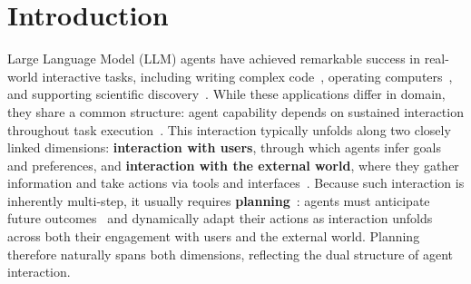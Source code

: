 \documentclass{llmxive}
\providecommand{\logoh}{1.35em}
\begin{document}
\vspace{-0.3in}
\begin{center}
\small

\renewcommand{\logoh}{1.35em}

\href{https://github.com/JiayuJeff/AdaPlanBench}{
\raisebox{-0.2\height}{}
}
\quad
\href{https://huggingface.co/datasets/JiayuJeff/AdaPlanBench}{
\raisebox{-0.2\height}{}
}

\end{center}





\section{Introduction}
\label{sec:intro}




Large Language Model (LLM) agents have achieved remarkable success in real-world interactive tasks, including writing complex code~\citep{claudecode,code2math}, operating computers~\citep{UI-TARS,UI-TARS-2}, and supporting scientific discovery~\citep{DR-Tulu,Deep-Research-Agents}.
While these applications differ in domain, they share a common structure: agent capability depends on sustained interaction throughout task execution~\citep{ReAct,park2023generativeagentsinteractivesimulacra}.
This interaction typically unfolds along two closely linked dimensions: \textbf{interaction with users}, through which agents infer goals and preferences, and \textbf{interaction with the external world}, where they gather information and take actions via tools and interfaces~\citep{xi2023risepotentiallargelanguage,Wang_2024}.
Because such interaction is inherently multi-step, it usually requires \textbf{planning}~\citep{huang2024understandingplanningllmagents}: agents must anticipate future outcomes~\citep{current-agent-fail-wm-as-tool} and dynamically adapt their actions as interaction unfolds~\citep{costbench} across both their engagement with users and the external world.
Planning therefore naturally spans both dimensions, reflecting the dual structure of agent interaction. 
\end{document}
